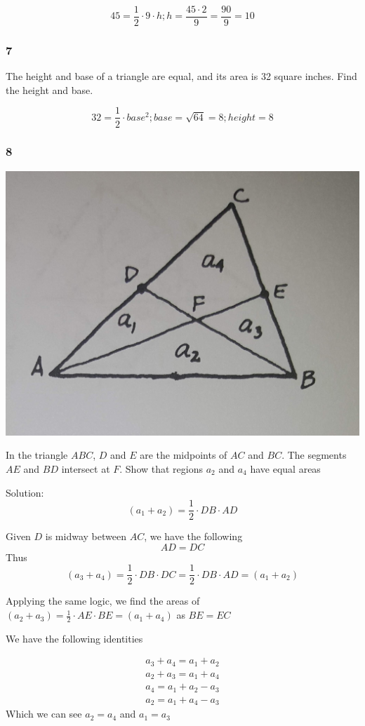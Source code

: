 \documentclass[]{report}
\begin{document}
\[
45 = \frac{1}{2} \cdot 9 \cdot h;
h = \frac{45\cdot2}{9} = \frac{90}{9} = 10
\]

\subsubsection{7}
The height and base of a triangle are equal, and its area is 32 square inches. Find the height and base.

\[
32 = \frac{1}{2}\cdot base^2;
base = \sqrt{64} = 8; height =8
\]

\subsubsection{8}
\includegraphics[width=\textwidth]{precalc-geo-section1-question-8.jpg}

In the triangle $ABC$, $D$ and $E$ are the midpoints of $AC$ and $BC$. The segments $AE$ and $BD$ intersect at $F$. Show that regions $a_2$ and $a_4$ have equal areas

Solution:
\[
(a_1 + a_2) = \frac{1}{2} \cdot DB \cdot AD
\]

Given $D$ is midway between $AC$, we have the following
\[
AD = DC
\]
Thus
\[
(a_3 + a_4) = \frac{1}{2} \cdot DB \cdot DC = \frac{1}{2} \cdot DB  \cdot AD = (a_1  + a_2)
\]

Applying the same logic, we find the areas of $(a_2  + a_3)  = \frac{1}{2}  \cdot AE \cdot BE  = (a_1 + a_4)$ as $BE = EC$

We have the following identities

\begin{align*}
a_3 + a_4 = a_1 + a_2  \tag{first}\\
a_2 + a_3 = a_1 + a_4  \tag{second}\\
a_4 = a_1 + a_2 - a_3 \tag{Rearranging first identity} \\
a_2 =a_1 + a_4 - a_3 \tag{Rearraging second identity}
\end{align*}
Which we can see $a_2 = a_4$ and $a_1 = a_3$
\end{document}
